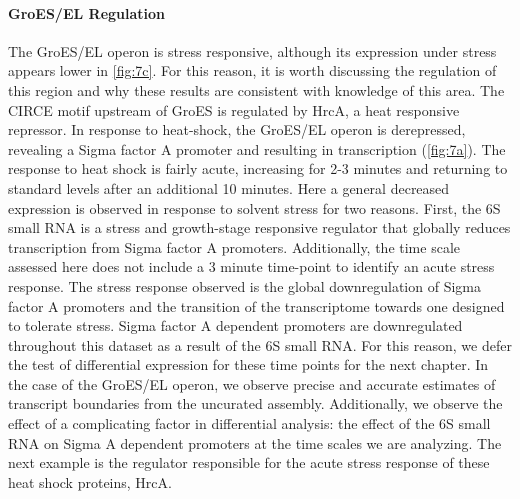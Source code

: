 \paragraph{GroES/EL Regulation}
The GroES/EL operon is stress responsive, although its expression under stress appears lower in \ref{fig:7c}. For this reason, it is worth discussing the regulation of this region and why these results are consistent with knowledge of this area. The CIRCE motif upstream of GroES is regulated by HrcA, a heat responsive repressor\cite{42,76,77}. In response to heat-shock, the GroES/EL operon is derepressed, revealing a Sigma factor A promoter and resulting in transcription (\ref{fig:7a}). The response to heat shock is fairly acute, increasing for 2-3 minutes and returning to standard levels after an additional 10 minutes\cite{76}. Here a general decreased expression is observed in response to solvent stress for two reasons. First, the 6S small RNA is a stress and growth-stage responsive regulator that globally reduces transcription from Sigma factor A promoters\cite{39,78}. Additionally, the time scale assessed here does not include a 3 minute time-point to identify an acute stress response. The stress response observed is the global downregulation of Sigma factor A promoters and the transition of the transcriptome towards one designed to tolerate stress. Sigma factor A dependent promoters are downregulated throughout this dataset as a result of the 6S small RNA. For this reason, we defer the test of differential expression for these time points for the next chapter. In the case of the GroES/EL operon, we observe precise and accurate estimates of transcript boundaries from the uncurated assembly. Additionally, we observe the effect of a complicating factor in differential analysis: the effect of the 6S small RNA on Sigma A dependent promoters at the time scales we are analyzing. The next example is the regulator responsible for the acute stress response of these heat shock proteins, HrcA.



